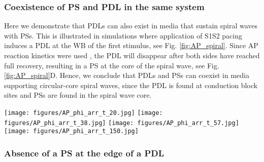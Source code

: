 \documentclass[aps,pre,amsfonts,amssymb,amsmath,twocolumn, superscriptaddress]{revtex4-1}
\begin{document}
\subsubsection{Coexistence of PS and PDL in the same system}

Here we demonstrate that PDLs can also exist in media that sustain spiral waves with PSs. This is illustrated in simulations where application of S1S2 pacing induces a PDL at the WB of the first stimulus, see Fig. \ref{fig:AP_spiral}. Since AP reaction kinetics were used \citep{Aliev:1996}, the PDL will disappear after both sides have reached full recovery, resulting in a PS at the core of the spiral wave, see Fig. \ref{fig:AP_spiral}D. Hence, we conclude that PDLs and PSs can coexist in media supporting circular-core spiral waves, since the PDL is found at conduction block sites and PSs are found in the spiral wave core.  


\begin{figure*}
    \centering
{} 
\texttt{[image: figures/AP\_phi\_arr\_t\_20.jpg]}
\texttt{[image: figures/AP\_phi\_arr\_t\_38.jpg]}
\texttt{[image: figures/AP\_phi\_arr\_t\_57.jpg]}
\texttt{[image: figures/AP\_phi\_arr\_t\_150.jpg]}
    \caption{Creation of a PS from a PDL using a S1-S2 protocol with AP kinetics, showing coexistence of PDL and PS in models that generate circular-core spirals. Snapshots A-D shown at times t=20ms, t=38ms, t=57ms and t=150ms.  }
    \label{fig:AP_spiral}
\end{figure*}


\subsubsection{Absence of a PS at the edge of a PDL}
\end{document}
